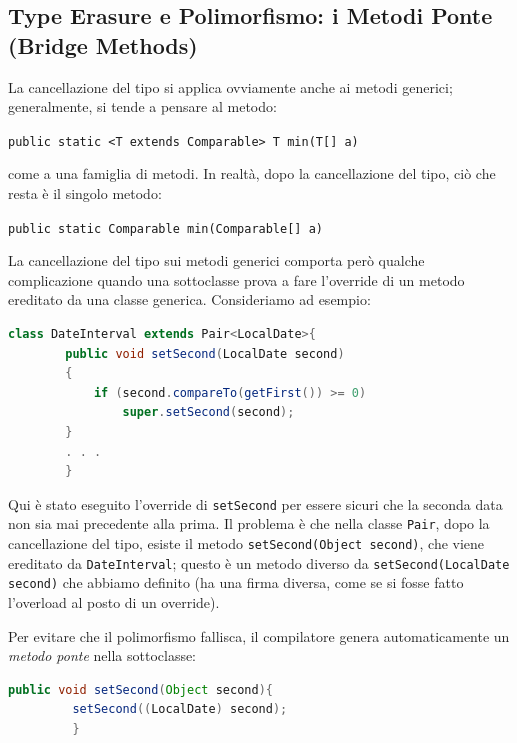 \subsection{Type Erasure e Polimorfismo: i Metodi Ponte (Bridge Methods)}

La cancellazione del tipo si applica ovviamente anche ai metodi generici; generalmente, si tende a pensare al metodo:
\begin{center}
    \texttt{public static <T extends Comparable> T min(T[] a)}
\end{center}

come a una famiglia di metodi. In realtà, dopo la cancellazione del tipo, ciò che resta è il singolo metodo:
\begin{center}
    \texttt{public static Comparable min(Comparable[] a)}
\end{center}

La cancellazione del tipo sui metodi generici comporta però qualche complicazione quando una sottoclasse prova a fare l'override di un metodo ereditato da una classe generica. Consideriamo ad esempio: 

\begin{lstlisting}[language=Java]
    class DateInterval extends Pair<LocalDate>{
        public void setSecond(LocalDate second)
        {
            if (second.compareTo(getFirst()) >= 0)
                super.setSecond(second);
        }
        . . .
        }
\end{lstlisting}

Qui è stato eseguito l'override di \texttt{setSecond} per essere sicuri che la seconda data non sia mai precedente alla prima. Il problema è che nella classe \texttt{Pair}, dopo la cancellazione del tipo, esiste il metodo \texttt{setSecond(Object second)}, che viene ereditato da \texttt{DateInterval}; questo è un metodo diverso da \texttt{setSecond(LocalDate second)} che abbiamo definito (ha una firma diversa, come se si fosse fatto l'overload al posto di un override). 

Per evitare che il polimorfismo fallisca, il compilatore genera automaticamente un \textit{metodo ponte} nella sottoclasse:
\begin{lstlisting}[language=Java]
    public void setSecond(Object second){
         setSecond((LocalDate) second); 
         }
\end{lstlisting}

